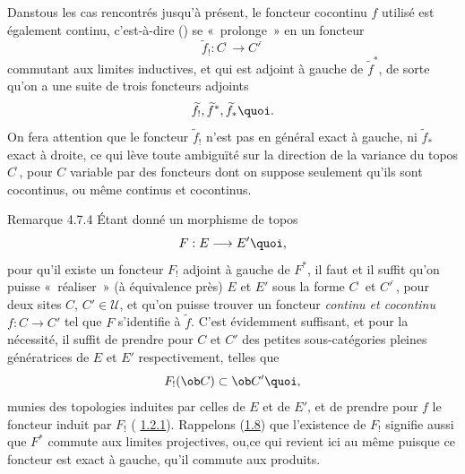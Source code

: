 \documentclass[10pt]{../fichiers-configuration-latex/smfart}
\begin{document}
Dans\pageoriginale tous les cas rencontrés jusqu'à présent, le
foncteur cocontinu $f$ utilisé est également continu,
c'est-à-dire () se « prolonge »  en un
foncteur
$$
\widetilde{f}_{!}:C^{\widetilde{\phantom{,}}}\longrightarrow
{C'}^{\widetilde{\phantom{,}}}
$$
commutant aux limites inductives, et qui est adjoint à gauche de
$\widetilde{f}^{\ast}$, de sorte qu'on a une suite de trois
foncteurs adjoints
$$
\widetilde{f}_{!}, \widetilde{f}^{\ast},
\widetilde{f}_{\ast}{\quoi}.
$$
On fera attention que le foncteur $\widetilde{f}_{!}$ n'est pas en
général exact à gauche, ni $\widetilde{f}_{\ast}$ exact à droite, ce
qui lève toute ambiguïté sur la direction de la variance du topos
$C^{\widetilde{\phantom{,}}}$, pour $C$ variable par des foncteurs
dont on suppose seulement qu'ils sont cocontinus, ou même continus
et cocontinus.

\begin{enonce*}[remark]{Remarque 4.7.4}
Étant donné un morphisme de topos
$$
F:E\longrightarrow E'{\quoi},
$$
pour qu'il existe un foncteur $F_{!}$ adjoint à gauche de
$F^{\ast}$, il faut et il suffit qu'on puisse « réaliser »
(à équivalence près) $E$ et $E'$ sous la forme
$C^{\widetilde{\phantom{,}}}$ et ${C'}^{\widetilde{\phantom{,}}}$,
pour deux sites $C$, $C'\in 𝒰$, et qu'on puisse trouver un
foncteur \emph{continu et cocontinu} $f:C\rightarrow C'$ tel que $F$
s'identifie à $\widetilde{f}$. C'est évidemment suffisant, et
pour la nécessité, il suffit de prendre pour $C$ et $C'$ des
petites sous-catégories pleines génératrices de $E$ et $E'$
respectivement, telles que
$$
F_{!}(\ob C)\subset \ob C'{\quoi},
$$
munies des topologies induites par celles de $E$ et de $E'$, et de
prendre pour $f$ le foncteur induit par $F_{!}$ (\cf
\hyperref[IV.cor1.2.1]{1.2.1}). Rappelons (\hyperref[IV.rem1.8]{1.8}) que l'existence de
$F_{!}$ signifie aussi que $F^{\ast}$ commute aux limites
projectives, ou,\pageoriginale ce qui revient ici au même puisque
ce foncteur est exact à gauche, qu'il commute aux produits.
\end{enonce*}

\setcounter{subsubsection}{4}
\end{document}
